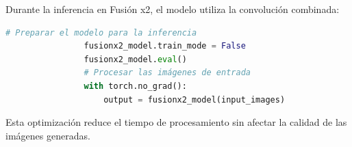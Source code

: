                 Durante la inferencia en Fusión x2, el modelo utiliza la convolución combinada:

                \begin{lstlisting}[language=Python]
                # Preparar el modelo para la inferencia
                fusionx2_model.train_mode = False
                fusionx2_model.eval()
                # Procesar las imágenes de entrada
                with torch.no_grad():
                    output = fusionx2_model(input_images)
                \end{lstlisting}

                Esta optimización reduce el tiempo de procesamiento sin afectar la calidad de las imágenes generadas.
